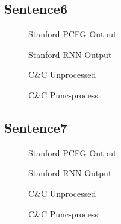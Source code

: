 \documentclass{article}
\begin{document}
\begin{landscape}

\section{Sentence6}
\begin{figure}[!h]
    \center{%
        \resizebox{1.2\textwidth}{!}{}
    }
    \caption{Stanford PCFG Output}
\end{figure}

\begin{figure}[!h]
    \center{%
        \resizebox{1.2\textwidth}{!}{}
    }
    \caption{Stanford RNN Output}
\end{figure}

\pagebreak
\begin{figure}[!h]
    \center{%
        \resizebox{1.2\textwidth}{!}{}
    }
	\caption{C\&C Unprocessed}
\end{figure}

\begin{figure}[!h]
    \center{%
        \resizebox{1.2\textwidth}{!}{}
    }
	\caption{C\&C Punc-process}
\end{figure}
\end{landscape}
\pagebreak

\begin{landscape}

\section{Sentence7}
\begin{figure}[!h]
    \center{%
        \resizebox{1.2\textwidth}{!}{}
    }
    \caption{Stanford PCFG Output}
\end{figure}

\begin{figure}[!h]
    \center{%
        \resizebox{1.2\textwidth}{!}{}
    }
    \caption{Stanford RNN Output}
\end{figure}

\pagebreak
\begin{figure}[!h]
    \center{%
        \resizebox{1.2\textwidth}{!}{}
    }
	\caption{C\&C Unprocessed}
\end{figure}

\begin{figure}[!h]
    \center{%
        \resizebox{1.2\textwidth}{!}{}
    }
	\caption{C\&C Punc-process}
\end{figure}
\end{landscape}
\pagebreak
\end{document}
